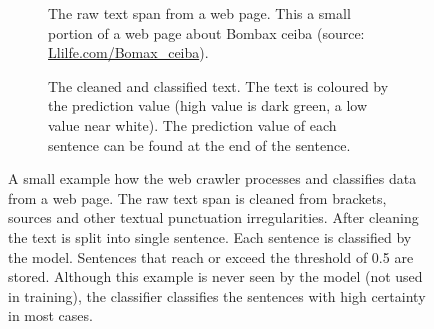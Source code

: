 \documentclass[a4paper, 12pt, oneside]{book} %
\begin{document}
\begin{figure} [h!]
     \centering
     \begin{subfigure}[b]{1.00\textwidth}
         \centering
         \caption[Raw text span example]{The raw text span from a web page. This a small portion of a web page about Bombax ceiba (source: \href{http://www.llifle.com/Encyclopedia/TREES/Family/Bombacaceae/31994/Bombax_ceiba}{Llilfe.com/Bomax\_ceiba}).}
         \label{fig:webcrawler_sents_nopred}
     \end{subfigure}
     \vfill
     \begin{subfigure}[b]{1.00\textwidth}
         \centering
         \caption[Cleaned and classified text span example]{The cleaned and classified text. The text is coloured by the prediction value (high value is dark green, a low value near white). The prediction value of each sentence can be found at the end of the sentence.}
         \label{fig:webcrawler_sents_pred}
     \end{subfigure}
     \caption[Example of the web crawler process]{A small example how the web crawler processes and classifies data from a web page. The raw text span is cleaned from brackets, sources and other textual punctuation irregularities. After cleaning the text is split into single sentence. Each sentence is classified by the model. Sentences that reach or exceed the threshold of 0.5 are stored. Although this example is never seen by the model (not used in training), the classifier classifies the sentences with high certainty in most cases.}
     \label{fig:webcrawler_sents}
\end{figure}
\end{document}
